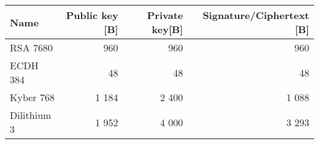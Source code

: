 \begin{tabular}{|l|r|r|r|}

  \hline
  Name        & Public key [B] & Private key[B] & Signature/Ciphertext [B] \\
  \hline
  RSA 7680    & 960            & 960            & 960                      \\
  ECDH 384    & 48             & 48             & 48                       \\
  Kyber 768   & 1 184          & 2 400          & 1 088                    \\
  Dilithium 3 & 1 952          & 4 000          & 3 293                    \\
  \hline
\end{tabular}
